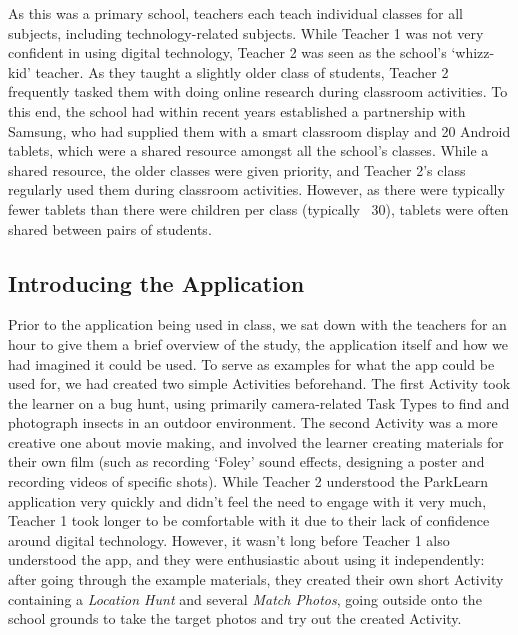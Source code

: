 As this was a primary school, teachers each teach individual classes for all subjects, including technology-related subjects. While Teacher 1 was not very confident in using digital technology, Teacher 2 was seen as the school's `whizz-kid' teacher. As they taught a slightly older class of students, Teacher 2 frequently tasked them with doing online research during classroom activities. To this end, the school had within recent years established a partnership with Samsung, who had supplied them with a smart classroom display and 20 Android tablets, which were a shared resource amongst all the school’s classes. While a shared resource, the older classes were given priority, and Teacher 2's class regularly used them during classroom activities. However, as there were typically fewer tablets than there were children per class (typically ~30), tablets were often shared between pairs of students.

\subsection{Introducing the Application}
\label{sec:IntroducingOurPlaceSchool1}

Prior to the application being used in class, we sat down with the teachers for an hour to give them a brief overview of the study, the application itself and how we had imagined it could be used. To serve as examples for what the app could be used for, we had created two simple Activities beforehand. The first Activity took the learner on a bug hunt, using primarily camera-related Task Types to find and photograph insects in an outdoor environment. The second Activity was a more creative one about movie making, and involved the learner creating materials for their own film (such as recording `Foley' sound effects, designing a poster and recording videos of specific shots). While Teacher 2 understood the ParkLearn application very quickly and didn't feel the need to engage with it very much, Teacher 1 took longer to be comfortable with it due to their lack of confidence around digital technology. However, it wasn't long before Teacher 1 also understood the app, and they were enthusiastic about using it independently: after going through the example materials, they created their own short Activity containing a \textit{Location Hunt} and several \textit{Match Photos}, going outside onto the school grounds to take the target photos and try out the created Activity. 

